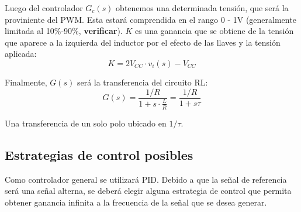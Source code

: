\documentclass[titlepage, 12pt]{article}
\begin{document}
    \begin{center}
    \end{center}

Luego del controlador $G_c(s)$ obtenemos una determinada tensión, que será la proviniente del PWM. Esta estará comprendida en el rango 0 - 1V (generalmente limitada al 10\%-90\%, \textbf{verificar}). $K$ es una ganancia que se obtiene de la tensión que aparece a la izquierda del inductor por el efecto de las llaves y la tensión aplicada:
\[
    K = 2V_{CC} \cdot v_i(s) - V_{CC}
\]

Finalmente, $G(s)$ será la transferencia del circuito RL:
\[
    G(s) = \frac{1/R}{1 + s \cdot \frac{L}{R}} = \frac{1/R}{1 + s\tau}
\]

Una transferencia de un solo polo ubicado en $1/\tau$.

\subsection{Estrategias de control posibles}
Como controlador general se utilizará PID. Debido a que la señal de referencia será una señal alterna, se deberá elegir alguna estrategia de control que permita obtener ganancia infinita a la frecuencia de la señal que se desea generar.
\end{document}
